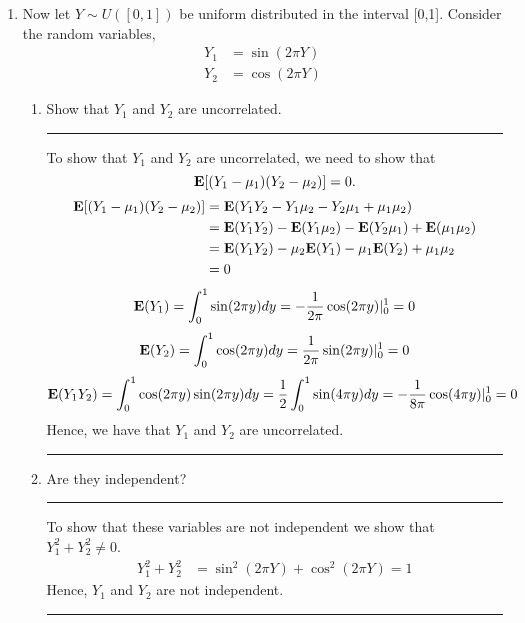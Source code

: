 \documentclass{article} %
\newcommand{\E}{{\mbox {\bf E}}}
\begin{document}
\begin{enumerate}
\rule{\textwidth}{1pt}
\item Now let $Y\sim U([0,1])$ be uniform distributed in the interval [0,1]. Consider the random variables, 
\begin{align*}
Y_1&=\sin(2\pi Y) \\
Y_2&=\cos(2\pi Y) 
\end{align*}
\begin{enumerate} 
\item Show that $Y_1$ and $Y_2$ are uncorrelated.  \\
\rule{\textwidth}{1pt}
To show that $Y_1$ and $Y_2$ are uncorrelated, we need to show that $$\E[(Y_1-\mu_1)(Y_2-\mu_2)] = 0.$$
\begin{align*}
\E[(Y_1-\mu_1)(Y_2-\mu_2)] &= \E(Y_1Y_2 -Y_1\mu_2 - Y_2\mu_1 + \mu_1\mu_2) \\
& = \E(Y_1Y_2) -\E(Y_1\mu_2) - \E(Y_2\mu_1) + \E(\mu_1\mu_2) \\
& = \E(Y_1Y_2) -\mu_2\E(Y_1) - \mu_1\E(Y_2) + \mu_1\mu_2 \\
& = 0
\end{align*}
\[ \E(Y_1) = \int_{0}^1 \sin(2\pi y)dy = -\frac{1}{2\pi} \cos(2\pi y)|_{0}^1 = 0   \] 
\[ \E(Y_2) = \int_{0}^1 \cos(2\pi y)dy = \frac{1}{2\pi} \sin(2\pi y)|_{0}^1 = 0   \] 
\[ \E(Y_1Y_2) = \int_{0}^1 \cos(2\pi y)\sin(2\pi y)dy =  \frac{1}{2}\int_{0}^1 \sin(4\pi y)dy = -\frac{1}{8\pi} \cos(4\pi y)|_{0}^1 = 0   \] 
Hence, we have that $Y_1$ and $Y_2$ are uncorrelated. \\
\rule{\textwidth}{1pt}
\item Are they independent? \\
\rule{\textwidth}{1pt}
To show that these variables are not independent we show that $Y_1^2+Y_2^2 \not=0$. 
\begin{align*}
Y_1^2+Y_2^2 &= \sin^2(2\pi Y) + \cos^2(2\pi Y) =1
\end{align*}
Hence, $Y_1$ and $Y_2$ are not independent. 

\rule{\textwidth}{1pt}
\end{enumerate}
 \end{enumerate}
\end{document}
